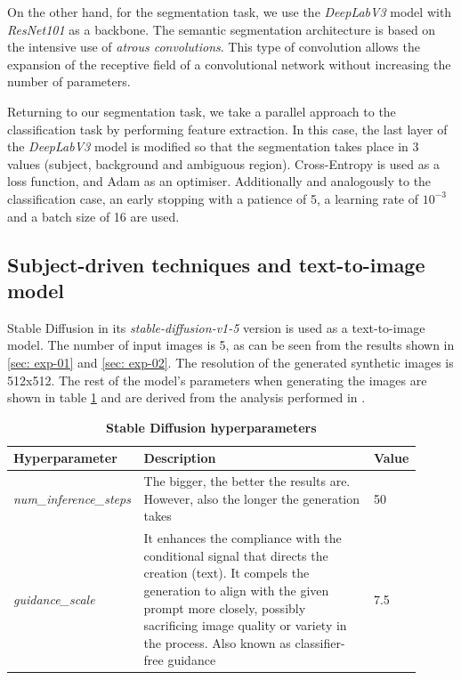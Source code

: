 On the other hand, for the segmentation task, we use the \textit{DeepLabV3} model \cite{chen2017rethinking} with \textit{ResNet101} as a backbone. The semantic segmentation architecture is based on the intensive use of \textit{atrous convolutions}. This type of convolution allows the expansion of the receptive field of a convolutional network without increasing the number of parameters. 

Returning to our segmentation task, we take a parallel approach to the classification task by performing feature extraction. In this case, the last layer of the \textit{DeepLabV3} model is modified so that the segmentation takes place in 3 values (subject, background and ambiguous region). Cross-Entropy is used as a loss function, and Adam as an optimiser. Additionally and analogously to the classification case, an early stopping with a patience of 5, a learning rate of $10^{-3}$ and a batch size of 16 are used.

\subsection{Subject-driven techniques and text-to-image model}

Stable Diffusion in its \textit{stable-diffusion-v1-5} version is used as a text-to-image model. The number of input images is 5, as can be seen from the results shown in \ref{sec: exp-01} and \ref{sec: exp-02}. The resolution of the generated synthetic images is 512x512. The rest of the model's parameters when generating the images are shown in table \ref{table:TableSDhyperparameters} and are derived from the analysis performed in \cite{stablediffusiondiffusers}.

\begin{table}[ht]
\centering
\begin{tabular}{|p{0.24\linewidth}|p{0.57\linewidth}|p{0.10\linewidth}|}
\hline
\rowcolor[HTML]{AEAAAA} 
\textbf{Hyperparameter} & \textbf{Description} & \textbf{Value} \\ \hline
\textit{num\_inference\_steps} & The bigger, the better the results are. However, also the longer the generation   takes & 50 \\ \hline
\textit{guidance\_scale} & It enhances the compliance with the conditional signal that directs the creation   (text). It compels the generation to align with the given prompt more closely, possibly sacrificing image quality or variety in the process. Also known as classifier-free guidance & 7.5 \\ \hline
\end{tabular}
\caption{\textbf{Stable Diffusion hyperparameters}}
\label{table:TableSDhyperparameters}
\end{table}

